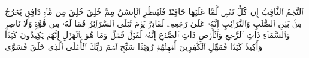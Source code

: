 ٱلنَّجۡمُ ٱلثَّاقِبُ%
\stopbuffer
\startbuffer[\q:86:4]
إِن كُلُّ نَفۡسࣲ لَّمَّا عَلَیۡهَا حَافِظࣱ%
\stopbuffer
\startbuffer[\q:86:5]
فَلۡیَنظُرِ ٱلۡإِنسَٰنُ مِمَّ خُلِقَ%
\stopbuffer
\startbuffer[\q:86:6]
خُلِقَ مِن مَّاۤءࣲ دَافِقࣲ%
\stopbuffer
\startbuffer[\q:86:7]
یَخۡرُجُ مِنۢ بَیۡنِ ٱلصُّلۡبِ وَٱلتَّرَاۤئِبِ%
\stopbuffer
\startbuffer[\q:86:8]
إِنَّهُۥ عَلَىٰ رَجۡعِهِۦ لَقَادِرࣱ%
\stopbuffer
\startbuffer[\q:86:9]
یَوۡمَ تُبۡلَى ٱلسَّرَاۤئِرُ%
\stopbuffer
\startbuffer[\q:86:10]
فَمَا لَهُۥ مِن قُوَّةࣲ وَلَا نَاصِرࣲ%
\stopbuffer
\startbuffer[\q:86:11]
وَٱلسَّمَاۤءِ ذَاتِ ٱلرَّجۡعِ%
\stopbuffer
\startbuffer[\q:86:12]
وَٱلۡأَرۡضِ ذَاتِ ٱلصَّدۡعِ%
\stopbuffer
\startbuffer[\q:86:13]
إِنَّهُۥ لَقَوۡلࣱ فَصۡلࣱ%
\stopbuffer
\startbuffer[\q:86:14]
وَمَا هُوَ بِٱلۡهَزۡلِ%
\stopbuffer
\startbuffer[\q:86:15]
إِنَّهُمۡ یَكِیدُونَ كَیۡدࣰا%
\stopbuffer
\startbuffer[\q:86:16]
وَأَكِیدُ كَیۡدࣰا%
\stopbuffer
\startbuffer[\q:86:17]
فَمَهِّلِ ٱلۡكَٰفِرِینَ أَمۡهِلۡهُمۡ رُوَیۡدَۢا%
\stopbuffer
\startbuffer[\q:87:1]
سَبِّحِ ٱسۡمَ رَبِّكَ ٱلۡأَعۡلَى%
\stopbuffer
\startbuffer[\q:87:2]
ٱلَّذِی خَلَقَ فَسَوَّىٰ%
\stopbuffer
